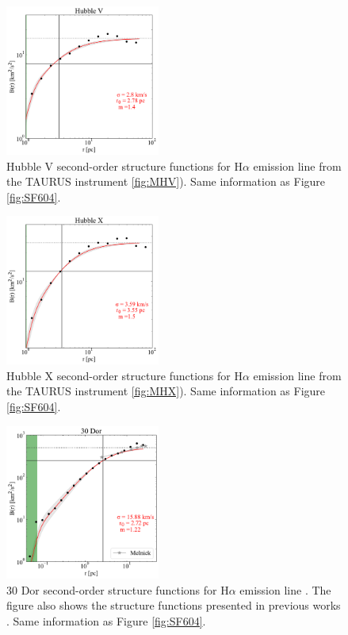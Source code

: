 \documentclass[fleqn,usenatbib, useAMS, a4paper]{mnras}
\begin{document}
\begin{figure}
\centering 
\includegraphics[width=2in]{Figures/SFplots/hubbleV}
\caption{Hubble V second-order structure functions for H$\alpha$ emission line from the TAURUS instrument \ref{fig:MHV}). Same information as Figure \ref{fig:SF604}.}
\label{fig:SFV}
\end{figure}

\begin{figure}
\centering 
\includegraphics[width=2in]{Figures/SFplots/hubbleX.pdf}
\caption{Hubble X second-order structure functions for H$\alpha$ emission line from the TAURUS instrument \ref{fig:MHX}). Same information as Figure \ref{fig:SF604}.}
\label{fig:SFX}
\end{figure}

\begin{figure}
\centering 
\includegraphics[width=2in]{Figures/SFplots/tarantula}
\caption{30 Dor second-order structure functions for H$\alpha$ emission line \citep{Castro:2018a}. The figure also shows the structure functions presented in previous works \citep{2019arXiv191203543M}. Same information as Figure \ref{fig:SF604}.}
\label{fig:SF30Dor}
\end{figure}
\end{document}
